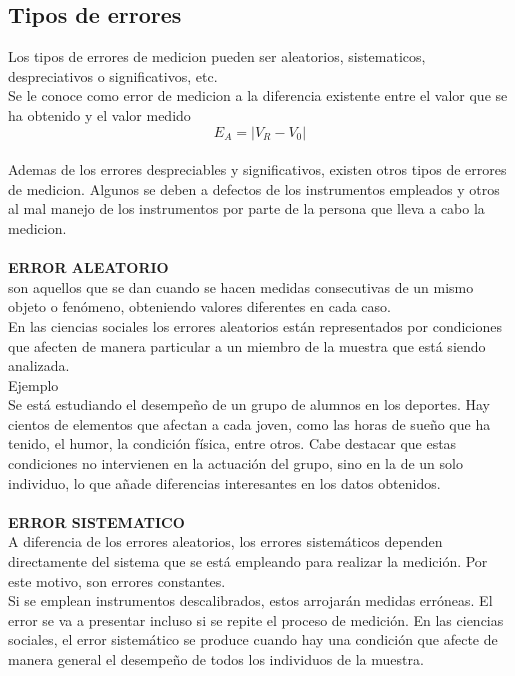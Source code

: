 \documentclass{article}
\begin{document}
\begin{multicols}{2}
\section{Tipos de errores}
\label{sec:Tipos}
Los tipos de errores de medicion pueden ser aleatorios, sistematicos, despreciativos o significativos, etc.
\\
Se le conoce como error de medicion a la diferencia existente entre el valor que se ha obtenido y el valor medido 
\begin{equation}
E_{A}=|V_{R}-V_{0}|
\end{equation}
\\
Ademas de los errores despreciables y significativos, existen otros tipos de errores de medicion. Algunos se deben a defectos de los instrumentos empleados y otros al mal manejo de los instrumentos por parte de la persona que lleva a cabo la medicion.
\\
\\
\textbf{ERROR ALEATORIO}
\\
son aquellos que se dan cuando se hacen medidas consecutivas de un mismo objeto o fenómeno, obteniendo valores diferentes en cada caso.
\\
En las ciencias sociales los errores aleatorios están representados por condiciones que afecten de manera particular a un miembro de la muestra que está siendo analizada.
\\
Ejemplo
\\
Se está estudiando el desempeño de un grupo de alumnos en los deportes. Hay cientos de elementos que afectan a cada joven, como las horas de sueño que ha tenido, el humor, la condición física, entre otros.
Cabe destacar que estas condiciones no intervienen en la actuación del grupo, sino en la de un solo individuo, lo que añade diferencias interesantes en los datos obtenidos.
\\
\\
\textbf{ERROR SISTEMATICO}
\\
A diferencia de los errores aleatorios, los errores sistemáticos dependen directamente del sistema que se está empleando para realizar la medición. Por este motivo, son errores constantes.
\\
Si se emplean instrumentos descalibrados, estos arrojarán medidas erróneas. El error se va a presentar incluso si se repite el proceso de medición.
En las ciencias sociales, el error sistemático se produce cuando hay una condición que afecte de manera general el desempeño de todos los individuos de la muestra.
\\

\end{multicols}
\end{document}
